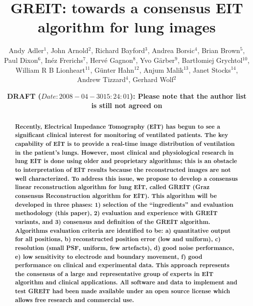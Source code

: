 \documentclass[letterpaper,twocolumn,10pt]{article}
\begin{document}
\title{\bf GREIT: towards a consensus EIT algorithm for lung images}

\author{Andy Adler$^{1}$,
        John Arnold$^{2}$,
        Richard Bayford$^{3}$,
        Andrea Borsic$^{4}$,
        Brian Brown$^{5}$,
\\
        Paul Dixon$^{6}$,
        In\'ez Frerichs$^{7}$,
        Herv\'e Gagnon$^{8}$,
        Yvo G\"arber$^{9}$,
        Bart\l{}omiej Grychtol$^{10}$, 
\\
        William R B Lionheart$^{11}$,
        G\"unter Hahn$^{12}$,
        Anjum Malik$^{13}$,
        Janet Stocks$^{14}$,
        Andrew Tizzard$^{4}$,
        Gerhard Wolf$^{2}$
       }

\date{\bf DRAFT ($Date: 2008-04-30 15:24:01 $): Please note that the
           author list is still not agreed on}
\maketitle

\begin{abstract}
\small \bf
Recently, Electrical Impedance Tomography (EIT) has begun to see a
significant clinical interest for monitoring of
ventilated patients.  The key capability of EIT is to
provide a real-time image distribution of ventilation in
the patient's lungs.
However, most clinical and physiological research in lung EIT
is done using older and proprietary algorithms; this is
an obstacle to interpretation of EIT results because the
reconstructed images are not well characterized.
To address this issue, we propose to develop a 
consensus linear reconstruction algorithm for lung EIT,
called GREIT (Graz consensus Reconstruction algorithm for EIT).
This algorithm will be developed in three phases:
1) selection of the ``ingredients'' and evaluation 
methodology (this paper),
2) evaluation and experience with GREIT variants, and
3) consensus and definition of the GREIT algorithm.
Algorithms evaluation criteria are identified to be:
a) quantitative output for all positions,
b) reconstructed position error (low and uniform),
c) resolution (small PSF, uniform, few artefacts),
d) good noise performance,
e) low sensitivity to electrode and boundary movement,
f) good performance on clinical and experimental data.
This approach represents the consensus of a large and representative
group of experts in EIT algorithm and clinical applications.
All software and data to implement and test GREIT had been
made available under an open source license which allows free
research and commercial use.
\end{abstract}
\end{document}
